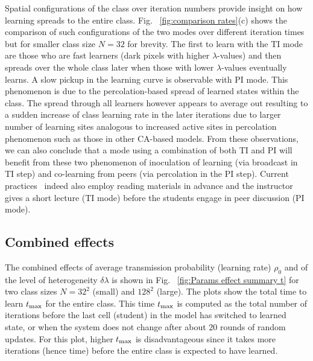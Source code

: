 \documentclass[twocolumn,secnumarabic,amssymb, nobibnotes, aps, prd]{revtex4-2}
\begin{document}
        Spatial configurations of the class over iteration numbers provide insight on how learning spreads to the entire class.
        Fig. ~\ref{fig:comparison rates}(c) shows the comparison of such configurations of the two modes over different iteration times but for smaller class size $N=32$ for brevity.
        The first to learn with the TI mode are those who are fast learners (dark pixels with higher $\lambda$-values) and then spreads over the whole class later when those with lower $\lambda$-values eventually learns.
        A slow pickup in the learning curve is observable with PI mode.
        This phenomenon is due to the percolation-based spread of learned states within the class.
        The spread through all learners however appears to average out resulting to a sudden increase of class learning rate in the later iterations due to larger number of learning sites analogous to increased active sites in percolation phenomenon such as those in other CA-based models\cite{Beauchemin2005}.
        From these observations, we can also conclude that a mode using a combination of both TI and PI will benefit from these two phenomenon of inoculation of learning (via broadcast in TI step) and co-learning from peers (via percolation in the PI step).
        Current practices~\cite{mazur1997peer,smith2009peer,lasry2008peer,roxas2010seating} indeed also employ reading materials in advance and the instructor gives a short lecture (TI mode) before the students engage in peer discussion (PI mode).
        
    \subsection{Combined effects}
        The combined effects of average transmission probability (learning rate) $\rho_0$ and of the level of heterogeneity $\delta\!\lambda$ is shown in Fig. ~\ref{fig:Params effect summary t} for two class sizes $N=32^2$ (small) and $128^2$ (large).
        The plots show the total time to learn $t_{\rm max}$ for the entire class.
        This time $t_{\rm max}$ is computed as the total number of iterations before the last cell (student) in the model has switched to learned state, or when the system does not change after about $20$ rounds of random updates.
        For this plot, higher $t_{\rm max}$ is disadvantageous since it takes more iterations (hence time) before the entire class is expected to have learned.
\end{document}
